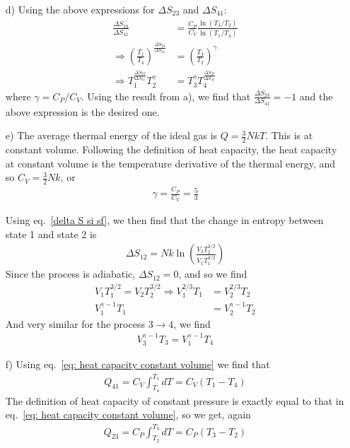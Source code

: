 \documentclass[11pt]{article}
\newcounter{excount}
\newenvironment{exercise}[1][]{\addtocounter{excount}{1} \noindent {\bf Exercise
    \arabic{excount} #1}\hspace{2mm}}{\vspace{4mm}}
\begin{document}
\begin{exercise}
\begin{itemize}
		
		\item[d)]
			Using the above expressions for $\Delta S_{23}$ and $\Delta S_{41}$:
			\begin{align*}
				\frac{\Delta S_{23}}{\Delta S_{41}} &= \frac{C_P}{C_V}\frac{\ln(T_3/T_2)}{\ln(T_1/T_4)} \\
				\Rightarrow \left( \frac{T_1}{T_4} \right)^{\frac{\Delta S_{23}}{\Delta S_{41}}} &= \left( \frac{T_3}{T_2} \right) ^\gamma \\
				\Rightarrow T_1^\frac{\Delta S_{23}}{\Delta S_{41}}T_2^\gamma &= T_3^\gamma T_4^\frac{\Delta S_{23}}{\Delta S_{41}}
			\end{align*}
			where $\gamma = C_P/C_V$. Using the result from a), we find that $\frac{\Delta S_{23}}{\Delta S_{41}}=-1$ and the above expression is the desired one.
		
		
		\item[e)]
			The average thermal energy of the ideal gas is $Q=\frac{3}{2}NkT$. This is at constant volume. Following the definition of heat capacity, the heat capacity at constant volume is the temperature derivative of the thermal energy, and so $C_V = \frac{3}{2}Nk$, or
			\begin{align*}
				\gamma = \frac{C_P}{C_V} = \frac{5}{3}
			\end{align*}
			
			Using eq.~\eqref{delta S si sf}, we then find that the change in entropy between state 1 and state 2 is
			\begin{align*}
				\Delta S_{12} = Nk\ln \left( \frac{V_2T_2^{3/2}}{V_1T_1^{3/2}} \right)
			\end{align*}
			Since the process is adiabatic, $\Delta S_{12} = 0$, and so we find
			\begin{align*}
				V_1T_1^{3/2} = V_2T_2^{3/2} \Rightarrow V_1^{2/3}T_1 &= V_2^{2/3}T_2 \\
				V_1^{\gamma-1}T_1 &= V_2^{\gamma-1}T_2
			\end{align*}
			And very similar for the process $3\rightarrow 4$, we find
			\begin{align*}
				V_3^{\gamma - 1}T_3 = V_1^{\gamma-1}T_4
			\end{align*}
			
		
		\item[f)]
			Using eq.~\eqref{eq: heat capacity constant volume} we find that 
			\begin{align*}
				Q_{41} = C_V\int_{T_4}^{T_1} dT = C_V(T_1 - T_4)
			\end{align*}
			The definition of heat capacity of constant pressure is exactly equal to that in eq.~\eqref{eq: heat capacity constant volume}, so we get, again
			\begin{align*}
				Q_{23} = C_P \int_{T_2}^{T_3} dT = C_P(T_3-T_2)
			\end{align*}
		

\end{itemize}
\end{exercise}
\end{document}
